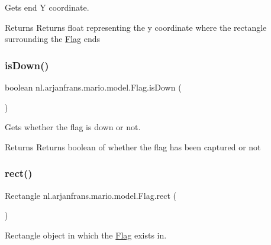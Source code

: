 Gets end Y coordinate. 

\begin{DoxyReturn}{Returns}
Returns float representing the y coordinate where the rectangle surrounding the \hyperlink{classnl_1_1arjanfrans_1_1mario_1_1model_1_1Flag}{Flag} ends 
\end{DoxyReturn}
\mbox{\label{classnl_1_1arjanfrans_1_1mario_1_1model_1_1Flag_aee023da973eca87f5ba2c809d81d4379}} 
\subsubsection{\texorpdfstring{is\+Down()}{isDown()}}
{\footnotesize\ttfamily boolean nl.\+arjanfrans.\+mario.\+model.\+Flag.\+is\+Down (\begin{DoxyParamCaption}{ }\end{DoxyParamCaption})}



Gets whether the flag is down or not. 

\begin{DoxyReturn}{Returns}
Returns boolean of whether the flag has been captured or not 
\end{DoxyReturn}
\mbox{\label{classnl_1_1arjanfrans_1_1mario_1_1model_1_1Flag_a1602244ce7c750bd95ac7265e50ad557}} 
\subsubsection{\texorpdfstring{rect()}{rect()}}
{\footnotesize\ttfamily Rectangle nl.\+arjanfrans.\+mario.\+model.\+Flag.\+rect (\begin{DoxyParamCaption}{ }\end{DoxyParamCaption})}



Rectangle object in which the \hyperlink{classnl_1_1arjanfrans_1_1mario_1_1model_1_1Flag}{Flag} exists in. 

